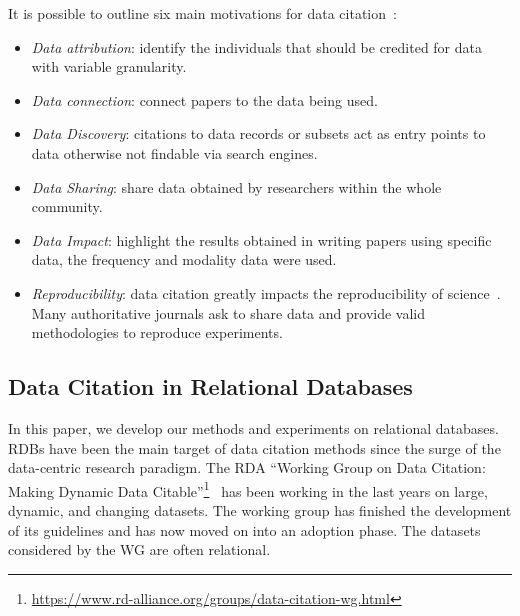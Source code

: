 It is possible to outline six main motivations for data citation~\citep{Silvello18jasist}:
\begin{itemize}
	\item \emph{Data attribution}: identify the individuals that should be credited for data with variable granularity.
	\item \emph{Data connection}: connect papers to the data being used.
    \item \emph{Data Discovery}: citations to data records or subsets act as entry points to data otherwise not findable via search engines. 
    \item \emph{Data Sharing}: share data obtained by researchers within the whole community. 
    \item \emph{Data Impact}: highlight the results obtained in writing papers using specific data, the frequency and modality data were used.
    \item \emph{Reproducibility}: data citation greatly impacts the reproducibility of science~\citep{baggerly2010disclose}. Many authoritative journals ask to share data and provide valid methodologies to reproduce experiments.
\end{itemize}

\subsection{Data Citation in Relational Databases}
In this paper, we develop our methods and experiments on relational databases. RDBs have been the main target of data citation methods since the surge of the data-centric research paradigm. 
The RDA ``Working Group on Data Citation: Making Dynamic Data Citable''\footnote{\url{https://www.rd-alliance.org/groups/data-citation-wg.html}}~\citep{RauberEtAl2016} has been working in the last years on large, dynamic, and changing datasets. The working group has finished the development of its guidelines and has now moved on into an adoption phase. 
The datasets considered by the WG are often relational.

